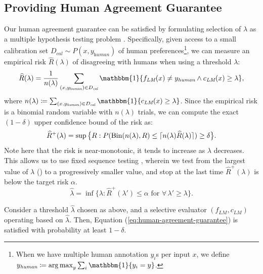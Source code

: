 \subsection{Providing Human Agreement Guarantee}\label{sec:providing_human_agreement_guarantee}
Our human agreement guarantee can be satisfied by formulating selection of $\lambda$ as a multiple hypothesis testing problem \citep{rcps, ltt}. Specifically, given access to a small calibration set $D_\textit{cal} \sim P(x, y_\textit{human})$ of human preferences\footnote{When we have multiple human annotation $y_i$s per input $x$, we define $y_\textit{human} \coloneqq \argmax_y \sum_{i} \mathbbm{1}\{y_i = y\}$.}, we can measure an empirical risk $\widehat{R}(\lambda)$ of disagreeing with humans when using a threshold $\lambda$:
\begin{equation}
    \widehat{R}(\lambda) = \frac{1}{n(\lambda)}\sum_{(x, y_\textit{human}) \in D_\textit{cal}} \mathbbm{1}\{f_\textit{LM}(x) \neq y_\textit{human} \land c_\textit{LM}(x) \ge \lambda\},
\end{equation}
where $n(\lambda) \coloneqq \sum_{(x, y_\textit{human}) \in D_\textit{cal}} \mathbbm{1}\{c_\textit{LM}(x) \ge \lambda\}$. Since the empirical risk is a binomial random variable with $n(\lambda)$ trials, we can compute the exact $(1 - \delta)$ upper confidence bound of the risk as:
\begin{equation}\label{eq:r-hat}
    \widehat{R}^{+}(\lambda) = \sup \big\{R: P(\operatorname*{Bin}(n(\lambda), R) \le \lceil n(\lambda) \widehat{R}(\lambda)\rceil) \ge \delta\big\}.
\end{equation}
Note here that the risk is near-monotonic, \ie it tends to increase as $\lambda$ decreases. This allows us to use fixed sequence testing \citep{fixed-sequence-testing}, wherein we test from the largest value of $\lambda$ () to a progressively smaller value, and stop at the last time $\widehat{R}^{+}(\lambda)$ is below the target risk $\alpha$.
\begin{equation}
    \widehat{\lambda} = \inf \big\{\lambda: \widehat{R}^{+}(\lambda') \le \alpha \text{ for } \forall \, \lambda' \ge \lambda\big\}.
\end{equation}

\begin{theorem}\label{thm:1}
    Consider a threshold $\widehat{\lambda}$ chosen as above, and a selective evaluator $(f_\textit{LM}, c_\textit{LM})$ operating based on $\widehat{\lambda}$. Then, Equation (\ref{eq:human-agreement-guarantee}) is satisfied with probability at least $1 - \delta$.
\end{theorem}

